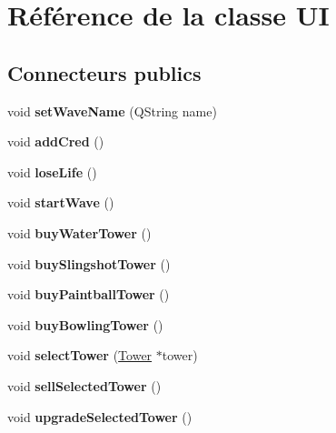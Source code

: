 \hypertarget{classUI}{
\section{Référence de la classe UI}
\label{classUI}
}
\subsection*{Connecteurs publics}
\begin{DoxyCompactItemize}
\item 
\hypertarget{classUI_a59dd7970680cae33350521f15e986259}{
void {\bfseries setWaveName} (QString name)}
\label{classUI_a59dd7970680cae33350521f15e986259}

\item 
\hypertarget{classUI_a00578d0269bf64abf71beb8b3e00a62b}{
void {\bfseries addCred} ()}
\label{classUI_a00578d0269bf64abf71beb8b3e00a62b}

\item 
\hypertarget{classUI_aea04048a2f3ab79ea3492c4f5e2e2c8d}{
void {\bfseries loseLife} ()}
\label{classUI_aea04048a2f3ab79ea3492c4f5e2e2c8d}

\item 
\hypertarget{classUI_adca7adc8d262fe82ce9eb3950b334416}{
void {\bfseries startWave} ()}
\label{classUI_adca7adc8d262fe82ce9eb3950b334416}

\item 
\hypertarget{classUI_a2dbc930f722c8acdf2c59a01a2760576}{
void {\bfseries buyWaterTower} ()}
\label{classUI_a2dbc930f722c8acdf2c59a01a2760576}

\item 
\hypertarget{classUI_a64d35e18b3b5b896caa69830190c1751}{
void {\bfseries buySlingshotTower} ()}
\label{classUI_a64d35e18b3b5b896caa69830190c1751}

\item 
\hypertarget{classUI_a098f1fd7e42c754f82e6d68aba33cbd1}{
void {\bfseries buyPaintballTower} ()}
\label{classUI_a098f1fd7e42c754f82e6d68aba33cbd1}

\item 
\hypertarget{classUI_ad9cc9c903122ceca1d750555ec95dda7}{
void {\bfseries buyBowlingTower} ()}
\label{classUI_ad9cc9c903122ceca1d750555ec95dda7}

\item 
\hypertarget{classUI_acc2450574743936721ad9d77b055d6d5}{
void {\bfseries selectTower} (\hyperlink{classTower}{Tower} $\ast$tower)}
\label{classUI_acc2450574743936721ad9d77b055d6d5}

\item 
\hypertarget{classUI_ad3666cc06e62117ba0ad65a1c3e6f1e5}{
void {\bfseries sellSelectedTower} ()}
\label{classUI_ad3666cc06e62117ba0ad65a1c3e6f1e5}

\item 
\hypertarget{classUI_a27f41a4f11f20308275dcb7638d25461}{
void {\bfseries upgradeSelectedTower} ()}
\label{classUI_a27f41a4f11f20308275dcb7638d25461}

\end{DoxyCompactItemize}
